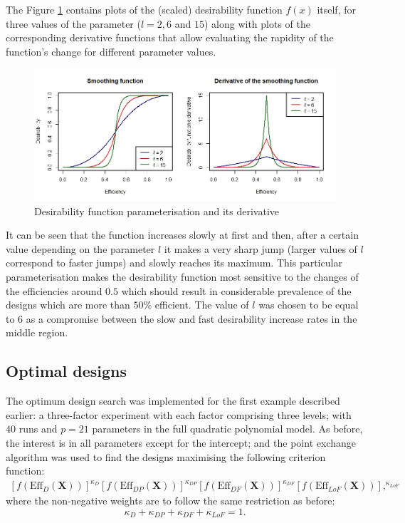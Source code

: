 The Figure \ref{Fig::des_fun} contains plots of the (scaled) desirability function $f(x)$ itself, for three values of the parameter ($l=2,6$ and $15$) along with plots of the corresponding derivative functions that allow evaluating the rapidity of the function's change for different parameter values.
\begin{figure}[h]
\begin{center}
\includegraphics[width=\textwidth]{DesFunPlot.jpg}
\caption{Desirability function parameterisation and its derivative}
\label{Fig::des_fun}
\end{center}
\end{figure}
It can be seen that the function increases slowly at first and then, after a certain value depending on the parameter $l$ it makes a very sharp jump (larger values of $l$ correspond to faster jumps) and slowly reaches its maximum. This particular parameterisation makes the desirability function most sensitive to the changes of the efficiencies around $0.5$ which should result in considerable prevalence of the designs which are more than $50\%$ efficient. The value of $l$ was chosen to be equal to $6$ as a compromise between the slow and fast desirability increase rates in the middle region.

\subsection{Optimal designs}
The optimum design search was implemented for the first example described earlier: a three-factor experiment with each factor comprising three levels; with $40$ runs and $p=21$ parameters in the full quadratic polynomial model. As before, the interest is in all parameters except for the intercept; and the point exchange algorithm was used to find the designs maximising the following criterion function:
\begin{multline*}
\left[f(\mbox{Eff}_D(\bm{X}))\right]^{\kappa_D}\left[f(\mbox{Eff}_{DP}(\bm{X}))\right]^{\kappa_{DP}}\left[f(\mbox{Eff}_{DF}(\bm{X}))\right]^{\kappa_{DF}}\left[f(\mbox{Eff}_{LoF}(\bm{X}))\right],^{\kappa_{LoF}}
\end{multline*}
where the non-negative weights are to follow the same restriction as before: 
\begin{equation*}
\kappa_{D}+\kappa_{DP}+\kappa_{DF}+\kappa_{LoF}=1.
\end{equation*} 

